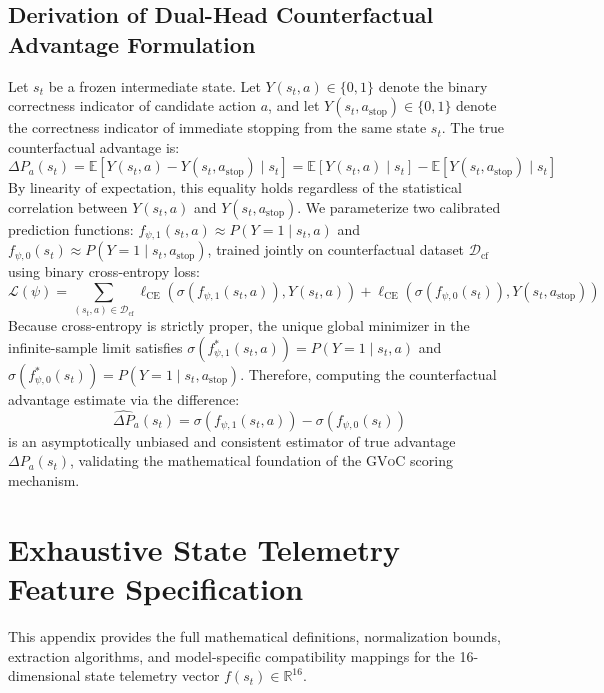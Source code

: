 \documentclass[11pt]{article}
\begin{document}
\subsection{Derivation of Dual-Head Counterfactual Advantage Formulation}
Let $s_t$ be a frozen intermediate state. Let $Y(s_t, a) \in \{0, 1\}$ denote the binary correctness indicator of candidate action $a$, and let $Y(s_t, a_{\text{stop}}) \in \{0, 1\}$ denote the correctness indicator of immediate stopping from the same state $s_t$. The true counterfactual advantage is:
\begin{equation}
\Delta P_a(s_t) = \mathbb{E}[Y(s_t, a) - Y(s_t, a_{\text{stop}}) \mid s_t] = \mathbb{E}[Y(s_t, a) \mid s_t] - \mathbb{E}[Y(s_t, a_{\text{stop}}) \mid s_t]
\end{equation}
By linearity of expectation, this equality holds regardless of the statistical correlation between $Y(s_t, a)$ and $Y(s_t, a_{\text{stop}})$. We parameterize two calibrated prediction functions: $f_{\psi,1}(s_t, a) \approx P(Y=1 \mid s_t, a)$ and $f_{\psi,0}(s_t) \approx P(Y=1 \mid s_t, a_{\text{stop}})$, trained jointly on counterfactual dataset $\mathcal{D}_{\text{cf}}$ using binary cross-entropy loss:
\begin{equation}
\mathcal{L}(\psi) = \sum_{(s_t, a) \in \mathcal{D}_{\text{cf}}} \ell_{\text{CE}}(\sigma(f_{\psi,1}(s_t, a)), Y(s_t, a)) + \ell_{\text{CE}}(\sigma(f_{\psi,0}(s_t)), Y(s_t, a_{\text{stop}}))
\end{equation}
Because cross-entropy is strictly proper, the unique global minimizer in the infinite-sample limit satisfies $\sigma(f^*_{\psi,1}(s_t, a)) = P(Y=1 \mid s_t, a)$ and $\sigma(f^*_{\psi,0}(s_t)) = P(Y=1 \mid s_t, a_{\text{stop}})$. Therefore, computing the counterfactual advantage estimate via the difference:
\begin{equation}
\hat{\Delta P}_a(s_t) = \sigma(f_{\psi,1}(s_t, a)) - \sigma(f_{\psi,0}(s_t))
\end{equation}
is an asymptotically unbiased and consistent estimator of true advantage $\Delta P_a(s_t)$, validating the mathematical foundation of the \textsc{GVoC} scoring mechanism.


\section{Exhaustive State Telemetry Feature Specification}
\label{app:telemetry}

This appendix provides the full mathematical definitions, normalization bounds, extraction algorithms, and model-specific compatibility mappings for the 16-dimensional state telemetry vector $f(s_t) \in \mathbb{R}^{16}$.
\end{document}
